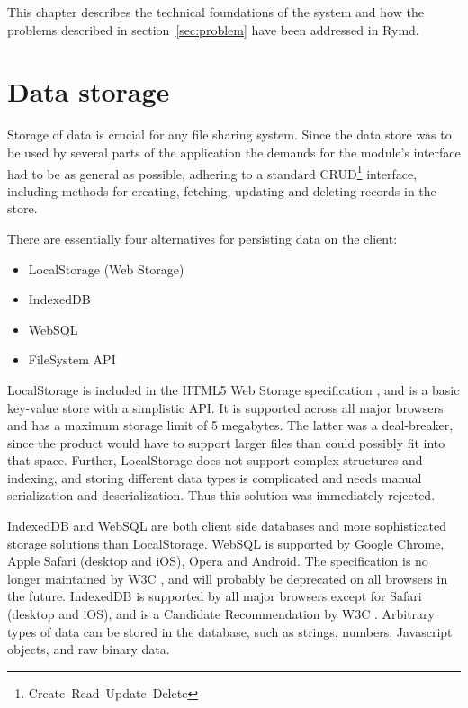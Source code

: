 This chapter describes the technical foundations of the system and how the problems described in section~\ref{sec:problem} have been addressed in Rymd.



\section{Data storage}

Storage of data is crucial for any file sharing system. Since the data store was to be used by several parts of the application the demands for the module's interface had to be as general as possible, adhering to a standard CRUD\footnote{Create–Read–Update–Delete} interface, including methods for creating, fetching, updating and deleting records in the store.

There are essentially four alternatives for persisting data on the client:

\begin{itemize}
\item LocalStorage (Web Storage)
\item IndexedDB
\item WebSQL
\item FileSystem API
\end{itemize}

LocalStorage is included in the HTML5 Web Storage specification \cite{WebStorage:Online}, and is a basic key-value store with a simplistic API. It is supported across all major browsers and has a maximum storage limit of 5 megabytes. The latter was a deal-breaker, since the product would have to support larger files than could possibly fit into that space. Further, LocalStorage does not support complex structures and indexing, and storing different data types is complicated and needs manual serialization and deserialization. Thus this solution was immediately rejected.

IndexedDB and WebSQL are both client side databases and more sophisticated storage solutions than LocalStorage. WebSQL is supported by Google Chrome, Apple Safari (desktop and iOS), Opera and Android. The specification is no longer maintained by W3C \cite{WebSQL:Online}, and will probably be deprecated on all browsers in the future. IndexedDB is supported by all major browsers except for Safari (desktop and iOS), and is a Candidate Recommendation by W3C \cite{IndexedDB:Online}. Arbitrary types of data can be stored in the database, such as strings, numbers, Javascript objects, and raw binary data.

